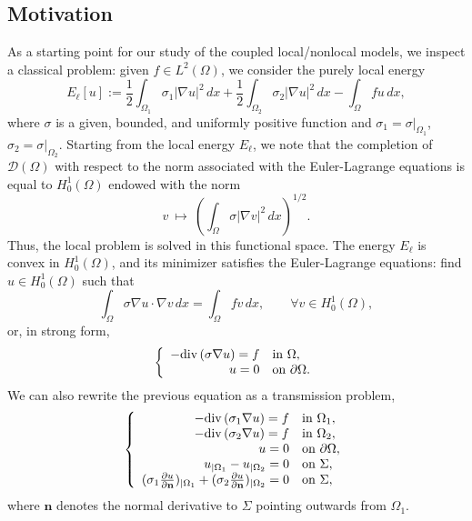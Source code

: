 \documentclass{amsart}
\newcommand{\Ol}{\Omega_{1}}%
\newcommand{\Onl}{\Omega_{2}}%
\def\vn{{\mathbf n}}
\def\Om{\Omega}
\renewcommand{\div}{{\rm div}\,}
\theoremstyle{plain}
\numberwithin{equation}{section}
\numberwithin{table}{section}
\numberwithin{figure}{section}
\numberwithin{theorem}{section}
\numberwithin{corollary}{section}
\numberwithin{definition}{section}
\numberwithin{lemma}{section}
\numberwithin{proposition}{section}
\numberwithin{remark}{section}
\begin{document}
\subsection{Motivation}\label{subsec-Motivation}
As a starting point for our study of the coupled local/nonlocal models, we inspect a classical problem: given $f\in L^2(\Om)$, we consider the purely local energy
\begin{equation} \label{eq:local_energy}
E_\ell[u] := \frac12 \int_{\Ol} \sigma_1  |\nabla u|^2\,dx + \frac12 \int_{\Onl} \sigma_2  |\nabla u|^2\,dx  - \int_\Omega  fu\,dx ,
\end{equation}
where $\sigma$ is a given, bounded, and uniformly positive function and $\sigma_1=\sigma|_{\Ol}$, $\sigma_2=\sigma|_{\Onl}$. Starting from the local energy $E_\ell$, we note that the completion of ${\mathcal D}(\Om)$ with respect to the norm associated with the Euler-Lagrange equations
is equal to $H^1_0(\Om)$ endowed with the norm
\[ 
v \ \mapsto\ \left(\int_\Om \sigma  |\nabla v|^2\,dx\right)^{1/2}.
\]
Thus, the local problem is solved in this functional space. 
The energy $E_\ell$ is convex in $H^1_0(\Omega)$, and its minimizer satisfies the Euler-Lagrange equations: find $u\in H^1_0(\Om)$ such that
\[
\int_\Om \sigma  \nabla u\cdot\nabla v\,dx = \int_\Omega f v \, dx, \qquad \forall v \in H^1_0(\Omega),
\]
or, in strong form,
\[\left\lbrace
\begin{array}{rl}
- \div(\sigma \nabla u) = f & \mbox{in } \Om, \\
u = 0 & \mbox{on } \partial\Omega.
\end{array}
\right. \]
We can also rewrite the previous equation as a transmission problem,
\begin{equation} \label{eq:local-transmission} \left\lbrace
\begin{array}{rl}
- \div(\sigma_1 \nabla u) = f & \mbox{in } \Ol, \\
- \div(\sigma_2 \nabla u) = f & \mbox{in } \Onl , \\
u = 0 & \mbox{on } \partial\Omega, \\
u_{|\Ol} - u_{|\Onl} = 0 & \mbox{on } \Sigma, \\
(\sigma_1 \frac{\partial u}{\partial \vn})_{|\Ol} + (\sigma_2 \frac{\partial u}{\partial \vn})_{|\Onl} = 0 & \mbox{on } \Sigma,
\end{array}
\right. \end{equation}
where $\vn$ denotes the normal derivative to $\Sigma$ pointing outwards from $\Ol$.
\end{document}
